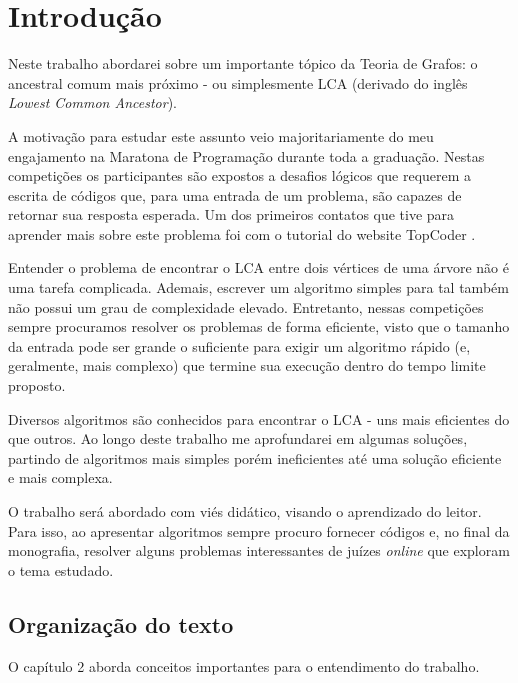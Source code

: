 \chapter{Introdução}
\label{cap:introducao}


Neste trabalho abordarei sobre um importante tópico da Teoria de Grafos: o ancestral comum mais próximo - ou simplesmente LCA (derivado do inglês \emph{Lowest Common 
Ancestor}).

A motivação para estudar este assunto veio majoritariamente do meu engajamento na Maratona de Programação durante toda a graduação. Nestas competições os participantes 
são expostos a desafios lógicos que requerem a escrita de códigos que, para uma 
entrada de um problema, são capazes de retornar sua resposta esperada. Um dos primeiros contatos que tive para aprender mais sobre este problema foi com o tutorial do website TopCoder \cite{top-coder}.

Entender o problema de encontrar o LCA entre dois vértices de uma árvore não é uma 
tarefa complicada. Ademais, escrever um algoritmo simples para tal também não possui 
um grau de complexidade elevado. Entretanto, nessas competições sempre procuramos 
resolver os problemas de forma eficiente, visto que o tamanho da entrada pode ser 
grande o suficiente para exigir um algoritmo rápido (e, geralmente, mais complexo) 
que termine sua execução dentro do tempo limite proposto.

Diversos algoritmos são conhecidos para encontrar o LCA - uns mais eficientes do 
que outros. Ao longo deste trabalho me aprofundarei em algumas soluções, partindo 
de algoritmos mais simples porém ineficientes até uma solução eficiente e mais complexa.

O trabalho será abordado com viés didático, visando o aprendizado do leitor. 
Para isso, ao apresentar algoritmos sempre procuro fornecer códigos e, no final da
monografia, resolver alguns problemas interessantes de juízes \emph{online} que 
exploram o tema estudado.


\section{Organização do texto}

O capítulo 2 aborda conceitos importantes para o entendimento do trabalho.

\vspace{0.2cm}

